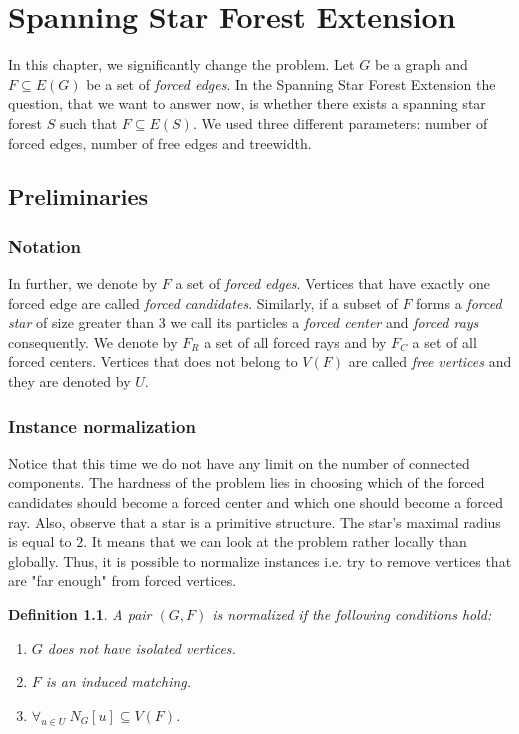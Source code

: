 \documentclass[en]{pracamgr}
\newtheorem{definition}{Definition}
\newcommand{\ssf}{spanning star forest}
\newcommand{\ssfep}{{\sc Spanning Star Forest Extension}}
\begin{document}
\fi

\chapter{Spanning Star Forest Extension}

In this chapter, we significantly change the problem. Let $G$ be a graph and $F \subseteq E(G)$ be a set of \emph{forced edges}. In the \ssfep{} the question, that we want to answer now, is whether there exists a \ssf{} $S$ such that $F \subseteq E(S)$. We used three different parameters: number of forced edges, number of free edges and treewidth. 

\section{Preliminaries}

\subsection{Notation}

In further, we denote by $F$ a set of \emph{forced edges}. Vertices that have exactly one forced edge are called \emph{forced candidates}. Similarly, if a subset of $F$ forms a \emph{forced star} of size greater than $3$ we call its particles a \emph{forced center} and \emph{forced rays} consequently. We denote by $F_R$ a set of all forced rays and by $F_C$ a set of all forced centers. Vertices that does not belong to $V(F)$ are called \emph{free vertices} and they are denoted by $U$.

\subsection{Instance normalization} 

Notice that this time we do not have any limit on the number of connected components. The hardness of the problem lies in choosing which of the forced candidates should become a forced center and which one should become a forced ray. Also, observe that a star is a primitive structure. The star's maximal radius is equal to $2$. It means that we can look at the problem rather locally than globally. Thus, it is possible to normalize instances i.e. try to remove vertices that are "far enough" from forced vertices.

\begin{definition}\label{norm-ssfe}
	A pair $(G,F)$ is normalized if the following conditions hold:
	\begin{enumerate}
		\item $G$ does not have isolated vertices.
		\item $F$ is an induced matching.
		\item $\forall_{u \in U}\ N_G[u] \subseteq V(F)$.
	\end{enumerate}
\end{definition}
\end{document}
